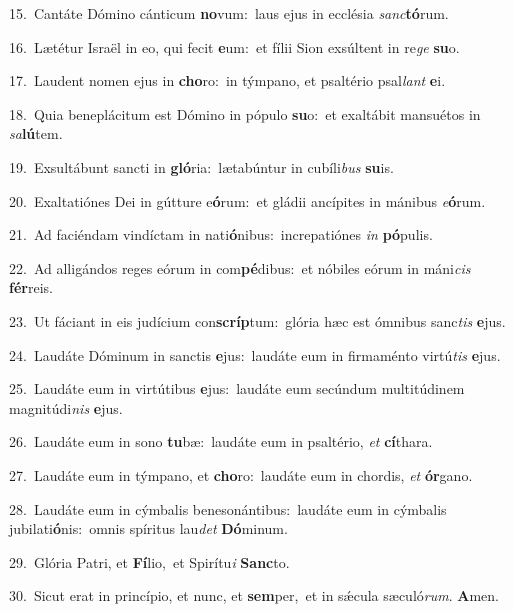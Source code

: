 {\numbfont\textcolor{\numbcolor}{15.}}~Cantáte Dómino cánticum \textbf{no}\-vum:~\star laus ejus in ecclésia \textit{sanc}\-\textbf{tó}rum.\par
{\numbfont\textcolor{\numbcolor}{16.}}~Lætétur Israël in eo, qui fecit \textbf{e}\-um:~\star et fílii Sion exsúltent in re\textit{ge} \textbf{su}\-o.\par
{\numbfont\textcolor{\numbcolor}{17.}}~Laudent nomen ejus in \textbf{cho}\-ro:~\star in týmpano, et psaltério psal\textit{lant} \textbf{e}\-i.\par
{\numbfont\textcolor{\numbcolor}{18.}}~Quia beneplácitum est Dómino in pópulo \textbf{su}\-o:~\star et exaltábit mansuétos in \textit{sa}\-\textbf{lú}tem.\par
{\numbfont\textcolor{\numbcolor}{19.}}~Exsultábunt sancti in \textbf{gló}\-ria:~\star lætabúntur in cubíli\textit{bus} \textbf{su}\-is.\par
{\numbfont\textcolor{\numbcolor}{20.}}~Exaltatiónes Dei in gútture e\-\textbf{ó}\-rum:~\star et gládii ancípites in mánibus \textit{e}\-\textbf{ó}rum.\par
{\numbfont\textcolor{\numbcolor}{21.}}~Ad faciéndam vindíctam in nati\-\textbf{ó}\-nibus:~\star increpatiónes \textit{in} \textbf{pó}\-pulis.\par
{\numbfont\textcolor{\numbcolor}{22.}}~Ad alligándos reges eórum in com\-\textbf{pé}\-dibus:~\star et nóbiles eórum in máni\textit{cis} \textbf{fér}\-reis.\par
{\numbfont\textcolor{\numbcolor}{23.}}~Ut fáciant in eis judícium con\-\textbf{scríp}\-tum:~\star glória hæc est ómnibus sanc\textit{tis} \textbf{e}\-jus.\par
{\numbfont\textcolor{\numbcolor}{24.}}~Laudáte Dóminum in sanctis \textbf{e}\-jus:~\star laudáte eum in firmaménto virtú\textit{tis} \textbf{e}\-jus.\par
{\numbfont\textcolor{\numbcolor}{25.}}~Laudáte eum in virtútibus \textbf{e}\-jus:~\star laudáte eum secúndum multitúdinem magnitúdi\textit{nis} \textbf{e}\-jus.\par
{\numbfont\textcolor{\numbcolor}{26.}}~Laudáte eum in sono \textbf{tu}\-bæ:~\star laudáte eum in psaltério, \textit{et} \textbf{cí}\-thara.\par
{\numbfont\textcolor{\numbcolor}{27.}}~Laudáte eum in týmpano, et \textbf{cho}\-ro:~\star laudáte eum in chordis, \textit{et} \textbf{ór}\-gano.\par
{\numbfont\textcolor{\numbcolor}{28.}}~Laudáte eum in cýmbalis benesonántibus:~\dagger laudáte eum in cýmbalis jubilati\-\textbf{ó}\-nis:~\star omnis spíritus lau\textit{det} \textbf{Dó}\-minum.\par
{\numbfont\textcolor{\numbcolor}{29.}}~Glória Patri, et \textbf{Fí}\-lio,~\star et Spirítu\textit{i} \textbf{Sanc}\-to.\par
{\numbfont\textcolor{\numbcolor}{30.}}~Sicut erat in princípio, et nunc, et \textbf{sem}\-per,~\star et in sǽcula sæculó\-\textit{rum}\-. \textbf{A}\-men.\par
